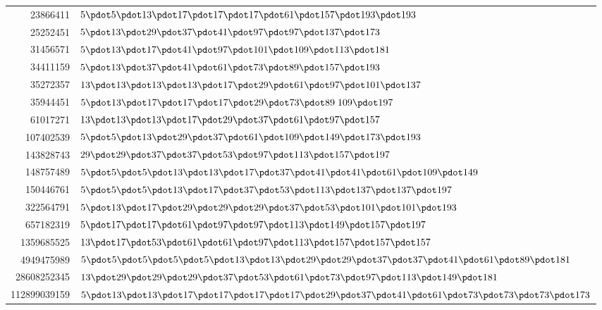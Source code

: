 %
\begingroup\small\setlength{\tabcolsep}{4pt}
\begin{longtable}{@{}r|l@{}}
23866411 & $5\pdot 5\pdot 13\pdot 17\pdot 17\pdot 17\pdot 61\pdot 157\pdot 193\pdot 193$\\
25252451 & $5\pdot 13\pdot 29\pdot 37\pdot 41\pdot 97\pdot 97\pdot 137\pdot 173$\\
31456571 & $5\pdot 13\pdot 17\pdot 41\pdot 97\pdot 101\pdot 109\pdot 113\pdot 181$\\
34411159 & $5\pdot 13\pdot 37\pdot 41\pdot 61\pdot 73\pdot 89\pdot 157\pdot 193$\\
35272357 & $13\pdot 13\pdot 13\pdot 13\pdot 17\pdot 29\pdot 61\pdot 97\pdot 101\pdot 137$\\
35944451 & $5\pdot 13\pdot 17\pdot 17\pdot 17\pdot 29\pdot 73\pdot 89\;109\pdot 197$\\
61017271 & $13\pdot 13\pdot 13\pdot 17\pdot 29\pdot 37\pdot 61\pdot 97\pdot 157$\\
107402539 & $5\pdot 5\pdot 13\pdot 29\pdot 37\pdot 61\pdot 109\pdot 149\pdot 173\pdot 193$\\
143828743 & $29\pdot 29\pdot 37\pdot 37\pdot 53\pdot 97\pdot 113\pdot 157\pdot 197$\\
148757489 & $5\pdot 5\pdot 5\pdot 13\pdot 13\pdot 17\pdot 37\pdot 41\pdot 41\pdot 61\pdot 109\pdot 149$\\
150446761 & $5\pdot 5\pdot 5\pdot 13\pdot 17\pdot 37\pdot 53\pdot 113\pdot 137\pdot 137\pdot 197$\\
322564791 & $5\pdot 13\pdot 17\pdot 29\pdot 29\pdot 29\pdot 37\pdot 53\pdot 101\pdot 101\pdot 193$\\
657182319 & $5\pdot 17\pdot 17\pdot 61\pdot 97\pdot 97\pdot 113\pdot 149\pdot 157\pdot 197$\\
1359685525 & $13\pdot 17\pdot 53\pdot 61\pdot 61\pdot 97\pdot 113\pdot 157\pdot 157\pdot 157$\\
4949475989 & $5\pdot 5\pdot 5\pdot 5\pdot 5\pdot 13\pdot 13\pdot 29\pdot 29\pdot 37\pdot 37\pdot 41\pdot 61\pdot 89\pdot 181$\\
28608252345 & $13\pdot 29\pdot 29\pdot 29\pdot 37\pdot 53\pdot 61\pdot 73\pdot 97\pdot 113\pdot 149\pdot 181$\\
112899039159 & $5\pdot 13\pdot 13\pdot 17\pdot 17\pdot 17\pdot 17\pdot 29\pdot 37\pdot 41\pdot 61\pdot 73\pdot 73\pdot 73\pdot 173$\\
\end{longtable}\endgroup
\par\medskip
\begingroup\small\setlength{\tabcolsep}{5pt}
